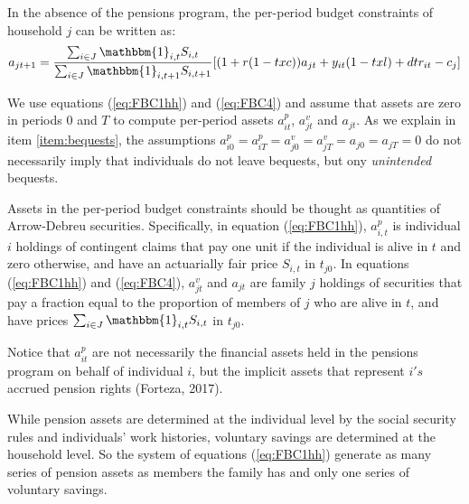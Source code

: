 \documentclass{article}
\begin{document}
\begin{enumerate}
In the absence of the pensions program, the per-period budget constraints of household $j$ can be written as:
\begin{equation} 	\label{eq:FBC4} 
      a_{jt+1}  = \frac{\sum_{i\in J} \mathbbm{1}_{i,t} S_{i,t}}{\sum_{i\in J} \mathbbm{1}_{i,t+1} S_{i,t+1}} [(1+r(1-txc)) a_{jt} + y_{it}(1-txl) +dtr_{it}  - c_{j}]
\end{equation}

We use equations (\ref{eq:FBC1hh}) and (\ref{eq:FBC4}) and assume that assets are zero in periods 0 and $T$ to compute per-period assets $a_{it}^p $, $a_{jt}^v$ and $a_{jt}$. As we explain in item \ref{item:bequests}, the assumptions $a_{i0}^p = a_{iT}^p = a_{j0}^v = a_{jT}^v=a_{j0}=a_{jT}=0$ do not necessarily imply that individuals do not leave bequests, but ony \textit{unintended} bequests.  

Assets in the per-period budget constraints should be thought as quantities of Arrow-Debreu securities. Specifically, in equation (\ref{eq:FBC1hh}), $a_{i,t}^p$  is individual $i$ holdings of contingent claims that pay one unit if the individual is alive in $t$ and zero otherwise, and have an actuarially fair price $S_{i,t}$ in $t_{j0}$. In equations (\ref{eq:FBC1hh}) and (\ref{eq:FBC4}), $a_{jt}^v$ and $a_{jt}$ are family $j$ holdings of securities that pay a fraction equal to the proportion of members of $j$ who are alive in $t$, and have prices $\sum_{i\in J} \mathbbm{1}_{i,t} S_{i,t}$  in $t_{j0}$. 

Notice that $a_{it}^p$ are not necessarily the financial assets held in the pensions program on behalf of individual $i$, but the implicit assets that represent $i's$ accrued pension rights (Forteza, 2017). 

While pension assets are determined at the individual level by the social security rules and individuals' work histories, voluntary savings are determined at the household level. So the system of equations (\ref{eq:FBC1hh}) generate as many series of pension assets as members the family has and only one series of voluntary savings.
	

\end{enumerate}
\end{document}

